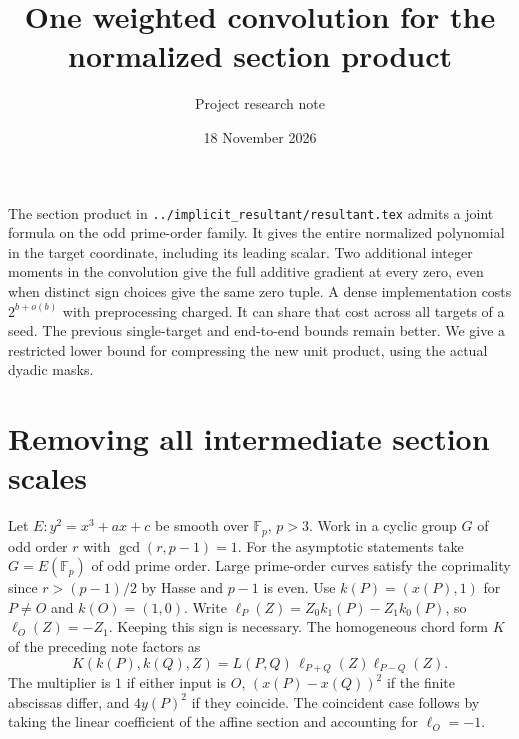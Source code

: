 \documentclass[11pt]{article}
\title{One weighted convolution for the normalized section product}
\author{Project research note}
\date{18 November 2026}
\newcommand{\F}{\mathbb F}
\begin{document}
\maketitle

The section product in \texttt{../implicit\_resultant/resultant.tex}
admits a joint formula on the odd prime-order family. It gives the
entire normalized polynomial in the target coordinate, including its
leading scalar. Two additional integer moments in the convolution
give the full additive gradient at every zero, even when distinct
sign choices give the same zero tuple. A dense implementation costs
$2^{b+o(b)}$ with preprocessing charged. It can share that cost across
all targets of a seed. The previous single-target and end-to-end bounds
remain better. We give a restricted lower bound for compressing the
new unit product, using the actual dyadic masks.

\section{Removing all intermediate section scales}
Let $E:y^2=x^3+ax+c$ be smooth over $\F_p$, $p>3$. Work in a cyclic
group $G$ of odd order $r$ with $\gcd(r,p-1)=1$. For the asymptotic
statements take $G=E(\F_p)$ of odd prime order. Large prime-order
curves satisfy the coprimality since $r>(p-1)/2$ by Hasse and $p-1$
is even. Use $k(P)=(x(P),1)$ for $P\ne O$ and $k(O)=(1,0)$.
Write $\ell_P(Z)=Z_0 k_1(P)-Z_1 k_0(P)$, so
$\ell_O(Z)=-Z_1$. Keeping this sign is necessary.
The homogeneous chord form $K$ of the preceding note factors as
\[
 K(k(P),k(Q),Z)=L(P,Q)\,\ell_{P+Q}(Z)\ell_{P-Q}(Z).
\]
The multiplier is $1$ if either input is $O$, $(x(P)-x(Q))^2$
if the finite abscissas differ, and $4y(P)^2$ if they coincide.
The coincident case follows by taking the linear coefficient of the
affine section and accounting for $\ell_O=-1$.
\end{document}
